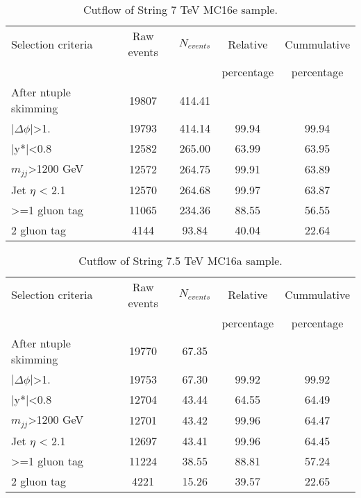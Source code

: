 \begin{table}[ht]
\begin{center}
\begin{tabular}{|l|c|c|c|c|}
\hline
Selection criteria & Raw events & $N_{events}$ & Relative & Cummulative \\
 & & & percentage & percentage \\
\hline
After ntuple skimming & 19807 & 414.41 &  &  \\
$|\Delta\phi|$>1. & 19793 & 414.14 & 99.94 & 99.94 \\
|y*|<0.8 & 12582 & 265.00 & 63.99 & 63.95 \\
$m_{jj}$>1200 GeV & 12572 & 264.75 & 99.91 & 63.89 \\
Jet $\eta$ < 2.1 & 12570 & 264.68 & 99.97 & 63.87 \\
>=1 gluon tag & 11065 & 234.36 & 88.55 & 56.55 \\
2 gluon tag & 4144 & 93.84 & 40.04 & 22.64 \\
\hline
\end{tabular}
\end{center}
\caption{Cutflow of String 7 TeV MC16e sample.}
\end{table}

\begin{table}[ht]
\begin{center}
\begin{tabular}{|l|c|c|c|c|}
\hline
Selection criteria & Raw events & $N_{events}$ & Relative & Cummulative \\
 & & & percentage & percentage \\
\hline
After ntuple skimming & 19770 & 67.35 &  &  \\
$|\Delta\phi|$>1. & 19753 & 67.30 & 99.92 & 99.92 \\
|y*|<0.8 & 12704 & 43.44 & 64.55 & 64.49 \\
$m_{jj}$>1200 GeV & 12701   & 43.42 & 99.96 & 64.47 \\
Jet $\eta$ < 2.1 & 12697 & 43.41 & 99.96 & 64.45 \\
>=1 gluon tag & 11224 & 38.55 & 88.81 & 57.24 \\
2 gluon tag & 4221 & 15.26 & 39.57 & 22.65 \\
\hline
\end{tabular}
\end{center}
\caption{Cutflow of String 7.5 TeV MC16a sample.}
\end{table}

